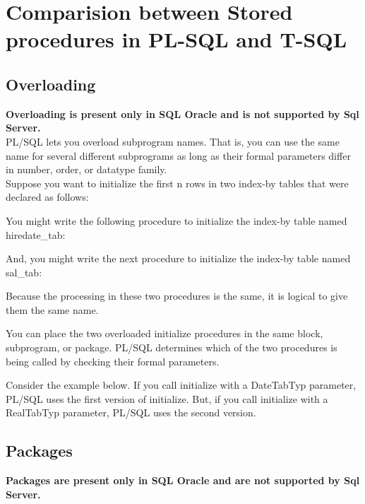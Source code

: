 \section{Comparision between Stored procedures in PL-SQL and T-SQL}

\subsection{Overloading}
\textbf{Overloading is present only in SQL Oracle and is not supported by Sql Server.}\\

PL/SQL lets you overload subprogram names. That is, you can use the same name for several different subprograms as long as their formal parameters differ in number, order, or datatype family.\\

Suppose you want to initialize the first n rows in two index-by tables that were declared as follows:



You might write the following procedure to initialize the index-by table named hiredate\_tab:



And, you might write the next procedure to initialize the index-by table named sal\_tab:



Because the processing in these two procedures is the same, it is logical to give them the same name.

You can place the two overloaded initialize procedures in the same block, subprogram, or package. PL/SQL determines which of the two procedures is being called by checking their formal parameters.

Consider the example below. If you call initialize with a DateTabTyp parameter, PL/SQL uses the first version of initialize. But, if you call initialize with a RealTabTyp parameter, PL/SQL uses the second version.


\subsection{Packages}
\textbf{Packages are present only in SQL Oracle and are not supported by Sql Server.}\\

